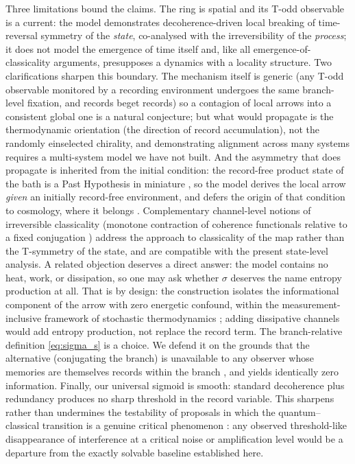 \documentclass[11pt]{article}
\begin{document}
Three limitations bound the claims. The ring is spatial and its T-odd observable is a current: the model demonstrates decoherence-driven local breaking of time-reversal symmetry of the \emph{state}, co-analysed with the irreversibility of the \emph{process}; it does not model the emergence of time itself and, like all emergence-of-classicality arguments, presupposes a dynamics with a locality structure. Two clarifications sharpen this boundary. The mechanism itself is generic (any T-odd observable monitored by a recording environment undergoes the same branch-level fixation, and records beget records) so a contagion of local arrows into a consistent global one is a natural conjecture; but what would propagate is the thermodynamic orientation (the direction of record accumulation), not the randomly einselected chirality, and demonstrating alignment across many systems requires a multi-system model we have not built. And the asymmetry that does propagate is inherited from the initial condition: the record-free product state of the bath is a Past Hypothesis in miniature \cite{Chen2024}, so the model derives the local arrow \emph{given} an initially record-free environment, and defers the origin of that condition to cosmology, where it belongs \cite{Halliwell1994}. Complementary channel-level notions of irreversible classicality (monotone contraction of coherence functionals relative to a fixed conjugation \cite{Gil2026}) address the approach to classicality of the map rather than the T-symmetry of the state, and are compatible with the present state-level analysis. A related objection deserves a direct answer: the model contains no heat, work, or dissipation, so one may ask whether $\sigma$ deserves the name entropy production at all. That is by design: the construction isolates the informational component of the arrow with zero energetic confound, within the measurement-inclusive framework of stochastic thermodynamics \cite{Landi2021}; adding dissipative channels would add entropy production, not replace the record term. The branch-relative definition \eqref{eq:sigma_s} is a choice. We defend it on the grounds that the alternative (conjugating the branch) is unavailable to any observer whose memories are themselves records within the branch \cite{Mlodinow2014}, and yields identically zero information. Finally, our universal sigmoid is smooth: standard decoherence plus redundancy produces no sharp threshold in the record variable. This sharpens rather than undermines the testability of proposals in which the quantum--classical transition is a genuine critical phenomenon \cite{Aharonov2000}: any observed threshold-like disappearance of interference at a critical noise or amplification level would be a departure from the exactly solvable baseline established here.
\end{document}
